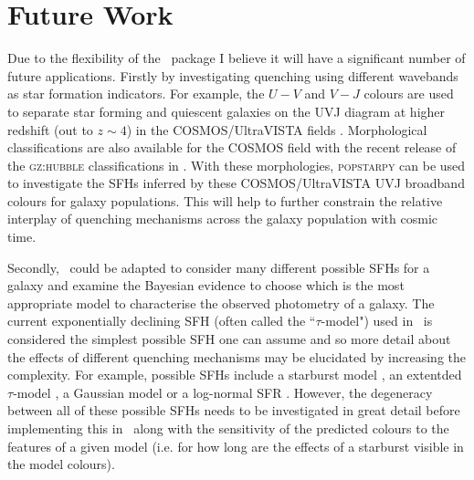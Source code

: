 \section{Future Work}\label{sec:future}

Due to the flexibility of the \starpy\ package I believe it will have a significant number of future applications. Firstly by investigating quenching using different wavebands as star formation indicators. For example, the $U-V$ and $V-J$ colours are used to separate star forming and quiescent galaxies on the UVJ diagram \citep{labbe05, wuyts07, williams09, brammer11, patel12} at higher redshift (out to $z\sim4$) in the COSMOS/UltraVISTA fields \citep[e.g. see work by][]{muzzin13}. Morphological classifications are also available for the COSMOS field with the recent release of the \textsc{gz:hubble} classifications in \cite{willett16}. With these morphologies, \textsc{popstarpy} can be used to investigate the SFHs inferred by these COSMOS/UltraVISTA UVJ broadband colours for galaxy populations. This will help to further constrain the relative interplay of quenching mechanisms across the galaxy population with cosmic time. 

Secondly, \starpy\ could be adapted to consider many different possible SFHs for a galaxy and examine the Bayesian evidence to choose which is the most appropriate model to characterise the observed photometry of a galaxy. The current exponentially declining SFH (often called the ``$\tau$-model") used in \starpy\ is considered the simplest possible SFH one can assume and so more detail about the effects of different quenching mechanisms may be elucidated by increasing the complexity. For example, possible SFHs include a starburst model \citep{kauffmann03}, an extentded $\tau$-model \citep{simha14}, a Gaussian model \citep{feuillet16} or a log-normal SFR \citep{gladders13, abramson16}. However, the degeneracy between all of these possible SFHs needs to be investigated in great detail before implementing this in \starpy\, along with the sensitivity of the predicted colours to the features of a given model (i.e. for how long are the effects of a starburst visible in the model colours). 


